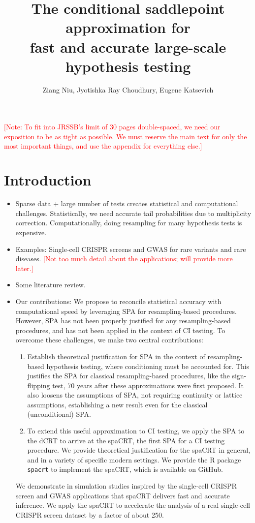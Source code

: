 \documentclass[12pt]{article}
\title{The conditional saddlepoint approximation for \\ fast and accurate large-scale hypothesis testing}
\theoremstyle{definition}
\begin{document}
\author{Ziang Niu, Jyotishka Ray Choudhury, Eugene Katsevich}
\maketitle

\noindent \textcolor{red}{[Note: To fit into JRSSB's limit of 30 pages double-spaced, we need our exposition to be as tight as possible. We must reserve the main text for only the most important things, and use the appendix for everything else.]}

\section{Introduction}
\begin{itemize}
  \item Sparse data + large number of tests creates statistical and computational challenges. Statistically, we need accurate tail probabilities due to multiplicity correction. Computationally, doing resampling for many hypothesis tests is expensive.
  \item Examples: Single-cell CRISPR screens and GWAS for rare variants and rare diseases. \textcolor{red}{[Not too much detail about the applications; will provide more later.]}
  \item Some literature review.
  \item Our contributions: We propose to reconcile statistical accuracy with computational speed by leveraging SPA for resampling-based procedures. However, SPA has not been properly justified for any resampling-based procedures, and has not been applied in the context of CI testing. To overcome these challenges, we make two central contributions:
  \begin{enumerate}
    \item Establish theoretical justification for SPA in the context of resampling-based hypothesis testing, where conditioning must be accounted for. This justifies the SPA for classical resampling-based procedures, like the sign-flipping test, 70 years after these approximations were first proposed. It also loosens the assumptions of SPA, not requiring continuity or lattice assumptions, establishing a new result even for the classical (unconditional) SPA.
    \item To extend this useful approximation to CI testing, we apply the SPA to the dCRT to arrive at the spaCRT, the first SPA for a CI testing procedure. We provide theoretical justification for the spaCRT in general, and in a variety of specific modern settings. We provide the R package \texttt{spacrt} to implement the spaCRT, which is available on GitHub. 
  \end{enumerate}
  We demonstrate in simulation studies inspired by the single-cell CRISPR screen and GWAS applications that spaCRT delivers fast and accurate inference. We apply the spaCRT to accelerate the analysis of a real single-cell CRISPR screen dataset by a factor of about 250.
\end{itemize}
\end{document}
